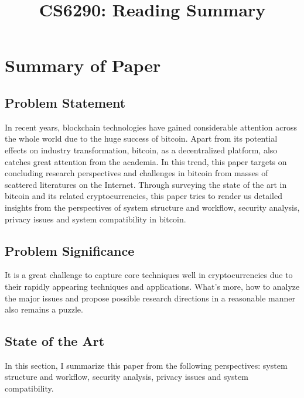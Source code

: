 \documentclass[conference]{IEEEtran}
\begin{document}
\title{CS6290: Reading Summary}

\author{
}

\maketitle

\section{Summary of Paper\cite{bonneau2015sok}}

\subsection{Problem Statement}
In recent years, blockchain technologies have gained considerable attention across the whole world due to the huge success of bitcoin. 
%
Apart from its potential effects on industry transformation, bitcoin, as a decentralized platform, also catches great attention from the academia.
%
In this trend, this paper\cite{bonneau2015sok} targets on concluding research perspectives and challenges in bitcoin from masses of scattered literatures on the Internet.
%
Through surveying the state of the art in bitcoin and its related cryptocurrencies, this paper tries to render us detailed insights from the perspectives of system structure and workflow, security analysis, privacy issues and system compatibility in bitcoin.

\subsection{Problem Significance}
It is a great challenge to capture core techniques well in cryptocurrencies due to their rapidly appearing techniques and applications.
%
What's more, how to analyze the major issues and propose possible research directions in a reasonable manner also remains a puzzle.


\subsection{State of the Art}
In this section, I summarize this paper from the following perspectives: system structure and workflow, security analysis, privacy issues and system compatibility.
\end{document}
